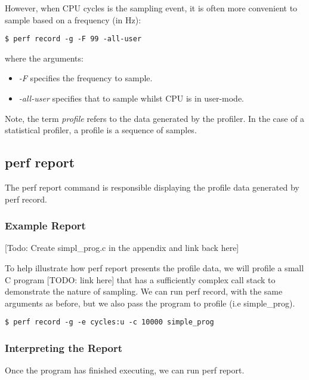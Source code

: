 However, when CPU cycles is the sampling event, it is often more convenient to sample based on a frequency (in Hz):

\lstset{language=bash}
\begin{lstlisting}
$ perf record -g -F 99 -all-user
\end{lstlisting}

where the arguments:

\ssp
\begin{itemize}
    \item \textit{-F} specifies the frequency to sample.
    \item \textit{-all-user} specifies that to sample whilst CPU is in user-mode.
\end{itemize}
\dsp

Note, the term \textit{profile} refers to the data generated by the profiler. In the case of a statistical profiler, a profile is a sequence of samples.

\subsection{perf report}

The perf report command is responsible displaying the profile data generated by perf record.

\subsubsection{Example Report}

[Todo: Create simpl\_prog.c in the appendix and link back here]

To help illustrate how perf report presents the profile data, we will profile a small C program [TODO: link here] that has a sufficiently complex call stack to demonstrate the nature of sampling. We can run perf record, with the same arguments as before, but we also pass the program to profile (i.e simple\_prog). 

\lstset{language=bash}
\begin{lstlisting}
$ perf record -g -e cycles:u -c 10000 simple_prog
\end{lstlisting}

\subsubsection{Interpreting the Report}

Once the program has finished executing, we can run perf report.

